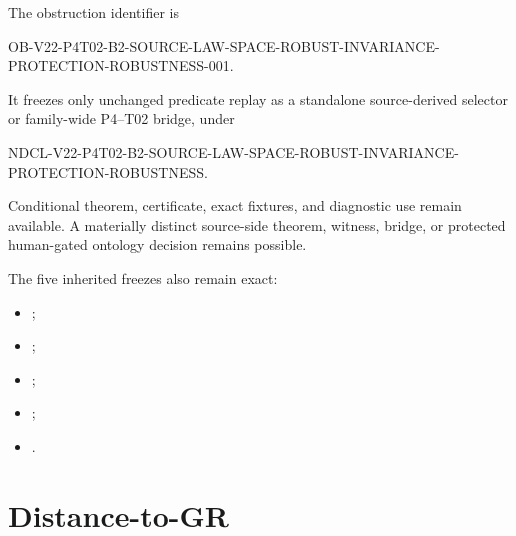 \documentclass[11pt]{article}
\begin{document}
The obstruction identifier is
\begin{flushleft}
\small\ttfamily
OB-V22-P4T02-B2-SOURCE-LAW-SPACE-ROBUST-INVARIANCE-\\
PROTECTION-ROBUSTNESS-001.
\end{flushleft}
It freezes only unchanged predicate replay as a standalone source-derived
selector or family-wide P4--T02 bridge, under
\begin{flushleft}
\small\ttfamily
NDCL-V22-P4T02-B2-SOURCE-LAW-SPACE-ROBUST-INVARIANCE-\\
PROTECTION-ROBUSTNESS.
\end{flushleft}
Conditional theorem, certificate, exact fixtures, and diagnostic use remain
available.  A materially distinct source-side theorem, witness, bridge, or
protected human-gated ontology decision remains possible.

The five inherited freezes also remain exact:
\begin{itemize}
  \item {};
  \item {};
  \item {};
  \item {};
  \item {}.
\end{itemize}

\section{Distance-to-GR}
\end{document}
